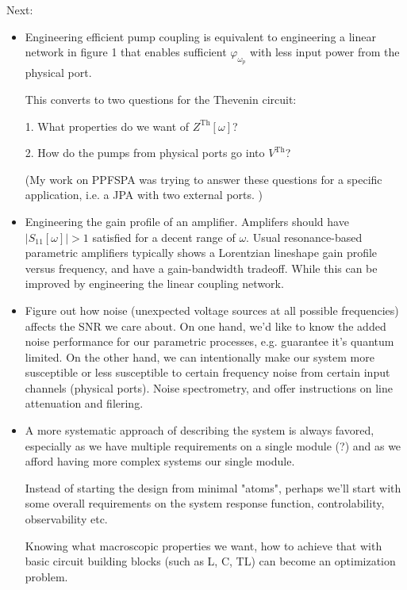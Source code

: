 \documentclass{article}
\newcommand{\Th}{\mathrm{Th}}
\begin{document}
\par
\par
Next: 

\begin{itemize}
	\item Engineering efficient pump coupling is equivalent to engineering a linear network in figure 1 that enables sufficient $\varphi_{\omega_p}$ with less input power from the physical port. 

This converts to two questions for the Thevenin circuit: 

1. What properties do we want of $Z^\Th[\omega]$? 

2. How do the pumps from physical ports go into $V^\Th$? 

(My work on PPFSPA was trying to answer these questions for a specific application, i.e. a JPA with two external ports. )

\item Engineering the gain profile of an amplifier. Amplifers should have $|S_{11}[\omega]| > 1$ satisfied for a decent range of $\omega$. Usual resonance-based parametric amplifiers typically shows a Lorentzian lineshape gain profile versus frequency, and have a gain-bandwidth tradeoff. While this can be improved by engineering the linear coupling network. 


\item Figure out how noise (unexpected voltage sources at all possible frequencies) affects the SNR we care about. On one hand, we'd like to know the added noise performance for our parametric processes, e.g. guarantee it's quantum limited. On the other hand, we can intentionally make our system more susceptible or less susceptible to certain frequency noise from certain input channels (physical ports). Noise spectrometry, and offer instructions on line attenuation and filering. 

\item A more systematic approach of describing the system is always favored, especially as we have multiple requirements on a single module (?) and as we afford having more complex systems our single module. 

Instead of starting the design from minimal "atoms", perhaps we'll start with some overall requirements on the system response function, controlability, observability etc. 

Knowing what macroscopic properties we want, how to achieve that with basic circuit building blocks (such as L, C, TL) can become an optimization problem. 


\end{itemize}
\end{document}
